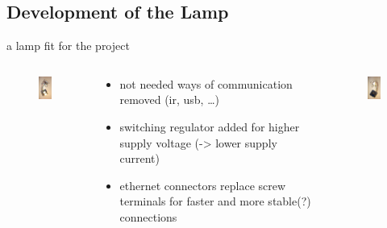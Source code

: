 \documentclass{beamer}
\begin{document}
 \subsection{Development of the Lamp}
  \begin{frame}{a lamp fit for the project}
    \begin{columns}
      \begin{column}{3.5cm}
        \begin{figure}
          \begin{center}
          \includegraphics[width=3cm]{bilder/lampe1.JPG}
          \end{center}
        \end{figure}
      \end{column}
      \begin{column}{5cm}
        \begin{itemize}
        \item not needed ways of communication removed (ir, usb, \ldots)
        \item switching regulator added for higher supply voltage (-> lower supply current)
        \item ethernet connectors replace screw terminals for faster and more stable(?) connections 
        \end{itemize}
      \end{column}
      \begin{column}{3.5cm}
         \begin{figure}
          \begin{center}
          \includegraphics[width=3cm]{bilder/lampe2.JPG}
          \end{center}
        \end{figure}
     \end{column}
    \end{columns}
  \end{frame}
\end{document}
